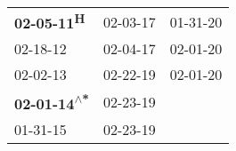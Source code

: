 \begin{supertabular}{lll}
         \textbf{02-05-11\textsuperscript{H}} &  02-03-17\textsuperscript{} &  01-31-20\textsuperscript{} \\
                   02-18-12\textsuperscript{} &  02-04-17\textsuperscript{} &  02-01-20\textsuperscript{} \\
                   02-02-13\textsuperscript{} &  02-22-19\textsuperscript{} &  02-01-20\textsuperscript{} \\
 \textbf{02-01-14\textsuperscript{$\wedge$*}} &  02-23-19\textsuperscript{} &                             \\
                   01-31-15\textsuperscript{} &  02-23-19\textsuperscript{} &                             \\
\end{supertabular}
